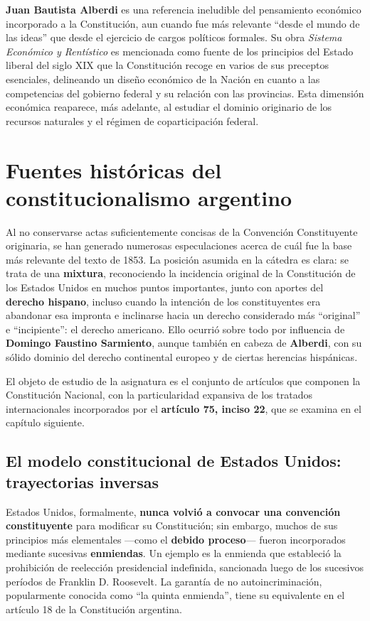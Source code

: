 \documentclass[12pt,oneside]{book}
\begin{document}
\textbf{Juan Bautista Alberdi} es una referencia ineludible del pensamiento económico incorporado a la Constitución, aun cuando fue más relevante ``desde el mundo de las ideas'' que desde el ejercicio de cargos políticos formales. Su obra \textit{Sistema Económico y Rentístico} es mencionada como fuente de los principios del Estado liberal del siglo XIX que la Constitución recoge en varios de sus preceptos esenciales, delineando un diseño económico de la Nación en cuanto a las competencias del gobierno federal y su relación con las provincias. Esta dimensión económica reaparece, más adelante, al estudiar el dominio originario de los recursos naturales y el régimen de coparticipación federal.

\section{Fuentes históricas del constitucionalismo argentino}

Al no conservarse actas suficientemente concisas de la Convención Constituyente originaria, se han generado numerosas especulaciones acerca de cuál fue la base más relevante del texto de 1853. La posición asumida en la cátedra es clara: se trata de una \textbf{mixtura}, reconociendo la incidencia original de la Constitución de los Estados Unidos en muchos puntos importantes, junto con aportes del \textbf{derecho hispano}, incluso cuando la intención de los constituyentes era abandonar esa impronta e inclinarse hacia un derecho considerado más ``original'' e ``incipiente'': el derecho americano. Ello ocurrió sobre todo por influencia de \textbf{Domingo Faustino Sarmiento}, aunque también en cabeza de \textbf{Alberdi}, con su sólido dominio del derecho continental europeo y de ciertas herencias hispánicas.

El objeto de estudio de la asignatura es el conjunto de artículos que componen la Constitución Nacional, con la particularidad expansiva de los tratados internacionales incorporados por el \textbf{artículo 75, inciso 22}, que se examina en el capítulo siguiente.

\subsection{El modelo constitucional de Estados Unidos: trayectorias inversas}

Estados Unidos, formalmente, \textbf{nunca volvió a convocar una convención constituyente} para modificar su Constitución; sin embargo, muchos de sus principios más elementales ---como el \textbf{debido proceso}--- fueron incorporados mediante sucesivas \textbf{enmiendas}. Un ejemplo es la enmienda que estableció la prohibición de reelección presidencial indefinida, sancionada luego de los sucesivos períodos de Franklin D. Roosevelt. La garantía de no autoincriminación, popularmente conocida como ``la quinta enmienda'', tiene su equivalente en el artículo 18 de la Constitución argentina.
\end{document}
